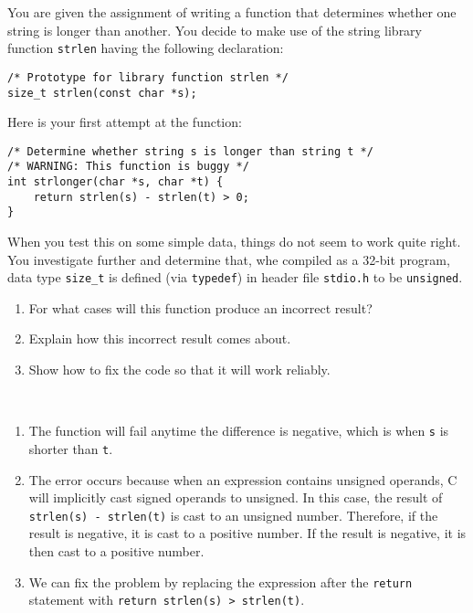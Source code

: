 \documentclass[12pt]{article}
\newenvironment{ex}[2][Exercise]{\begin{trivlist}
		\item[\hskip \labelsep {\bfseries #1}\hskip \labelsep {\bfseries #2.}]}{\end{trivlist}}
\newenvironment{sol}[1][Solution]{\begin{trivlist}
		\item[\hskip \labelsep {\bfseries #1:}]}{\end{trivlist}}
\begin{document}
\begin{ex}{2.26}
	You are given the assignment of writing a function that determines whether one string is
	longer than another. You decide to make use of the string library function \texttt{strlen}
	having the following declaration:
	\begin{lstlisting}
/* Prototype for library function strlen */
size_t strlen(const char *s);
	\end{lstlisting}
	Here is your first attempt at the function:
	\begin{lstlisting}
/* Determine whether string s is longer than string t */
/* WARNING: This function is buggy */
int strlonger(char *s, char *t) {
	return strlen(s) - strlen(t) > 0;
}
	\end{lstlisting}
	When you test this on some simple data, things do not seem to work quite right. You
	investigate further and determine that, whe compiled as a 32-bit program, data type
	\texttt{size\_t} is defined (via \texttt{typedef}) in header file \texttt{stdio.h} to
	be \texttt{unsigned}.
	\begin{enumerate}[label=(\alph*)]
		\item For what cases will this function produce an incorrect result?
		\item Explain how this incorrect result comes about.
		\item Show how to fix the code so that it will work reliably.
	\end{enumerate}
\end{ex}

\begin{sol}
	\
	\begin{enumerate}[label=(\alph*)]
		\item The function will fail anytime the difference is negative, which is when
		\texttt{s} is shorter than \texttt{t}.
		\item The error occurs because when an expression contains unsigned operands,
		C will implicitly cast signed operands to unsigned. In this case, the result of \texttt{strlen(s) - strlen(t)} is cast to an unsigned number. Therefore, if the result is negative, it is
		cast to a positive number. If the result is negative, it is then cast to a positive
		number.
		\item We can fix the problem by replacing the expression after the \texttt{return} statement
		with \texttt{return strlen(s) > strlen(t)}.
	\end{enumerate}
\end{sol}
\end{document}
